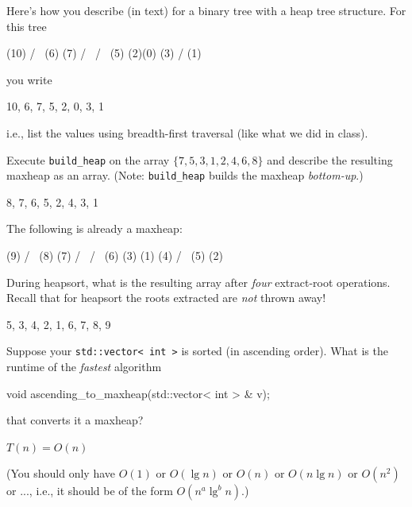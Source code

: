 

Here's how you describe (in text) for a binary tree with a heap tree structure.
For this tree
\begin{console}[fontsize=\footnotesize]
             (10)
           /      \
        (6)        (7)
       /   \      /   \
    (5)     (2)(0)     (3)
   /
(1)
\end{console}
you write
\begin{console}[fontsize=\footnotesize]
{10, 6, 7, 5, 2, 0, 3, 1}
\end{console}
i.e., list the values using breadth-first traversal (like what we did in class).

\nextq
Execute \verb!build_heap! on the array
$\{7, 5, 3, 1, 2, 4, 6, 8\}$ and describe the resulting maxheap
as an array.
(Note: \verb!build_heap! builds the maxheap \textit{bottom-up}.)
\\
\ANSWER
\begin{answercode}
{8, 7, 6, 5, 2, 4, 3, 1}
\end{answercode}

\nextq
The following is already a maxheap:
\begin{console}[fontsize=\footnotesize]
              (9)
           /       \
        (8)         (7)
       /   \       /   \
    (6)     (3) (1)     (4)
   /   \
(5)     (2)
\end{console}
During heapsort, what is the resulting array after
\textit{four} extract-root operations.
Recall that for heapsort the roots extracted are \textit{not} thrown away!
\\
\ANSWER
\begin{answercode}
{5, 3, 4, 2, 1, 6, 7, 8, 9}
\end{answercode}

\nextq
Suppose your \verb!std::vector< int >! is sorted (in ascending order).
What is the runtime of the \textit{fastest} algorithm
\begin{console}
void ascending_to_maxheap(std::vector< int > & v);
\end{console}
that converts it a maxheap?
\\
\ANSWER
\begin{answerlong}
$T(n) = O(n)$
\end{answerlong}
(You should only have
$O(1)$ or $O(\lg n)$ or $O(n)$ or $O(n \lg n)$ or $O(n^2)$ or ..., i.e.,
it should be of the form $O(n^a \lg^b n)$.)

